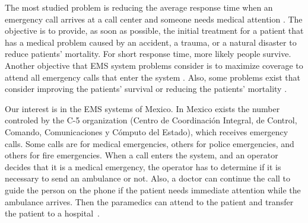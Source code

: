 The most studied problem is reducing the average response time when an emergency call arrives at a call center and someone needs medical attention \cite{blackwell2002response}. 
The objective is to provide, as soon as possible, the initial treatment for a patient that has a medical problem caused by an accident, a trauma, or a natural disaster to reduce patients' mortality. For short response time, more likely people survive. Another objective that EMS system problems consider is to maximize coverage to attend all emergency calls that enter the system \cite{chanta2014improving}. Also, some problems exist that consider improving the patients' survival or reducing the patients' mortality \cite{zaffar2016coverage}. 



Our interest is in the EMS systems of Mexico. In Mexico exists the  number controled by the C-5 organization (Centro de Coordinación Integral, de Control, Comando, Comunicaciones y Cómputo del Estado), which receives e\-mer\-gen\-cy calls. Some calls are for medical emergencies, others for police e\-mer\-gen\-cies, and others for fire emergencies. When a call enters the system, and an operator decides that it is a medical emergency, the operator has to determine if it is necessary to send an ambulance or not. Also, a doctor can continue the call to guide the person on the phone if the patient needs immediate attention while the ambulance arrives. Then the paramedics can attend to the patient and transfer the patient to a hospital~\cite{911_op}.

